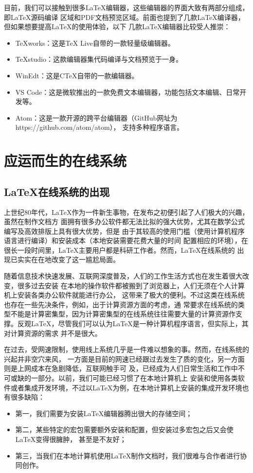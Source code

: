目前，我们可以接触到很多LaTeX编辑器，这些编辑器的界面大致有两部分组成，即LaTeX源码编译
区域和PDF文档预览区域。前面也提到了几款LaTeX编译器，但如果想要提高LaTeX的使用体验，以下
几款LaTeX编辑器比较受人推崇：
\begin{itemize}
      \item TeXworks：这是TeX Live自带的一款轻量级编辑器。
      \item TeXstudio：这款编辑器集代码编译与文档预览于一身。
      \item WinEdt：这是CTeX自带的一款编辑器。
      \item VS Code：这是微软推出的一款免费文本编辑器，功能包括文本编辑、日常开发等。
      \item Atom：这是一款开源的跨平台编辑器（GitHub网址为https://github.com/atom/atom），
            支持多种程序语言。
\end{itemize}

\section{应运而生的在线系统}
\subsection{\LaTeX 在线系统的出现}
上世纪80年代，LaTeX作为一件新生事物，在发布之初便引起了人们极大的兴趣，虽然在制作文档方
面拥有很多办公软件都无法比拟的强大优势，尤其在数学公式编写及高效排版上具有很大优势，但是
由于其较高的使用门槛（使用计算机程序语言进行编译）和安装成本（本地安装需要花费大量的时间
配置相应的环境），在很长一段时间里，LaTeX主要用户都是科研工作者。然而，LaTeX在线系统的
出现已实实在在地改变了这一尴尬局面。

随着信息技术快速发展、互联网深度普及，人们的工作生活方式也在发生着很大改变，很多过去安装
在本地的操作软件都被搬到了浏览器上，人们无须在个人计算机上安装各类办公软件就能进行办公，
这带来了极大的便利。不过这类在线系统也存在一些先决条件，例如，出于计算资源方面的考虑，通
常要求在线系统的类型不能是计算密集型，因为计算密集型的在线系统往往需要大量的计算资源作支
撑。反观LaTeX，尽管我们可以认为LaTeX是一种计算机程序语言，但实际上，其对计算资源的需求
并不是很大。

在过去，受网速限制，使用线上系统几乎是一件难以想象的事。然而，在线系统的兴起并非空穴来风，
一方面是目前的网速已经跟过去发生了质的变化，另一方面则是上网成本在急剧降低，互联网触手可
及，已经成为人们日常生活和工作中不可或缺的一部分。以前，我们可能已经习惯了在本地计算机上
安装和使用各类软件或者集成开发环境，不过以LaTeX为例，在本地计算机上安装的集成开发环境也
有很多缺陷：
\begin{itemize}
      \item 第一，我们需要为安装LaTeX编辑器腾出很大的存储空间；
      \item 第二，某些特定的宏包需要额外安装和配置，但安装过多宏包之后又会使LaTeX变得很臃肿，
            甚至是不友好；
      \item 第三，当我们在本地计算机使用LaTeX制作文档时，我们很难与合作者进行协同创作。
\end{itemize}

